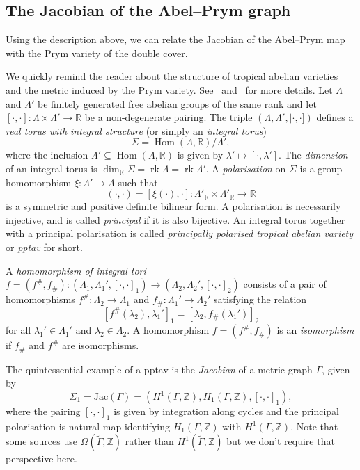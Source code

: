 \documentclass[11pt]{article}
\theoremstyle{definition}
\numberwithin{equation}{section}
\theoremstyle{definition}
\newcommand{\R}{\mathbb{R}}
\newcommand{\ZZ}{\mathbb{Z}}
\newcommand{\Ga}{\Gamma}
\newcommand{\La}{\Lambda}
\newcommand{\Si}{\Sigma}
\DeclareMathOperator{\Hom}{Hom}
\DeclareMathOperator{\rk}{rk}
\newcommand{\wt}[1]{\widetilde{#1}}
\begin{document}
\subsection{The Jacobian of the Abel--Prym graph}\label{sec:JacobianVSPrym}


Using the description above, we can relate the Jacobian of the Abel--Prym map with the Prym variety of the double cover. 

We quickly remind the reader about the structure of tropical abelian varieties and the metric induced by the Prym variety. See~\cite[Section $2$]{LZ22} and~\cite[Section $4$]{RZ_ngonal} for more details. Let $\Lambda$ and $\Lambda'$ be finitely generated free abelian groups of the same rank and let $[\cdot, \cdot] : \Lambda \times \Lambda' \to \R$ be a non-degenerate pairing. The triple $(\Lambda, \Lambda', |\cdot, \cdot])$ defines a \emph{real torus with integral structure} (or simply an \emph{integral torus})  
 \[
 \Si=\Hom(\Lambda, \R) / \Lambda',
 \]
 where the inclusion $\Lambda' \subseteq \Hom(\Lambda, \R)$ is given by $\lambda' \mapsto [\cdot,\lambda']$.
The \emph{dimension} of an integral torus is $\dim_{\R}\Si=\rk \La=\rk \La'$. 
 A \emph{polarisation} on $\Sigma$ is a group homomorphism $\xi : \Lambda' \to \Lambda$ such that 
 \[
 (\cdot,\cdot) = [\xi(\cdot), \cdot] \colon \Lambda'_\R \times \Lambda'_\R \to \R
 \]
 is a symmetric and positive definite bilinear form. A polarisation is necessarily injective, and is called \emph{principal} if it is also bijective.
  An integral torus together with a principal polarisation is called \emph{principally polarised tropical abelian variety} or \emph{pptav} for short.


A \emph{homomorphism of integral tori} $f=(f^{\#},f_{\#})\colon (\Lambda_1,\Lambda_1',[\cdot,\cdot]_1)\to (\Lambda_2,\Lambda_2',[\cdot,\cdot]_2)$ consists of a pair of homomorphisms $f^{\#}\colon \Lambda_2\to \Lambda_1$
and $f_{\#}\colon \Lambda_1'\to \Lambda_2'$
satisfying the relation 
\[
[f^{\#}(\lambda_2),\lambda_1']_1=[\lambda_2,f_{\#}(\lambda_1')]_2
\]
for all $\lambda_1'\in\Lambda_1'$ and $\lambda_2\in \Lambda_2$.
A homomorphism $f=(f^{\#},f_{\#})$ is an \emph{isomorphism} if $f_{\#}$ and $f^{\#}$
are isomorphisms.

The quintessential example of a pptav is the  \emph{Jacobian} of a metric graph $\Ga$, given by
\[
\Si_1=\mathrm{Jac}(\Ga)=(H^1(\Ga,\ZZ),H_1(\Ga,\ZZ),[\cdot,\cdot]_1),
\] 
where the pairing $[\cdot,\cdot]_1$ is given by integration along cycles and the principal polarisation is natural map identifying  $H_1(\Gamma,\ZZ)$ with $H^1(\Gamma,\ZZ)$. Note that some sources use $\Omega(\wt\Gamma,\ZZ)$ rather than $H^1(\wt\Gamma,\ZZ)$ but we don't require that perspective here. 
\end{document}
